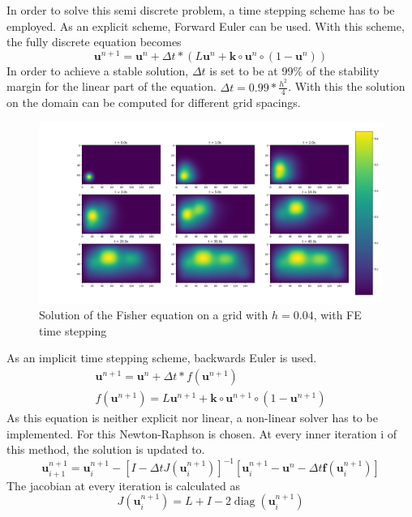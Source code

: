 \documentclass{article}
\begin{document}
In order to solve this semi discrete problem, a time stepping scheme has to be employed. As an explicit scheme, Forward Euler can be used. With this scheme, the fully discrete equation becomes
\begin{equation}
\mathbf{u}^{n+1} = \mathbf{u}^n+\Delta t*\left(L \mathbf{u}^n + \mathbf{k}\circ\mathbf{u}^n\circ\left(1-\mathbf{u}^n\right)\right)
\end{equation}
In order to achieve a stable solution, $\Delta t$ is set to be at 99\% of the stability margin for the linear part of the equation. $\Delta t = 0.99*\frac{h^2}{4}$. With this the solution on the domain can be computed for different grid spacings.
\begin{figure}[H]
	\centering
	\includegraphics[width=.9\linewidth]{4FE.png}
	\caption{Solution of the Fisher equation on a grid with $h=0.04$, with FE time stepping}
\end{figure}
As an implicit time stepping scheme, backwards Euler is used.
\begin{align}
\mathbf{u}^{n+1} = \mathbf{u}^n+\Delta t*f(\mathbf{u}^{n+1})\\
f(\mathbf{u}^{n+1})=L \mathbf{u}^{n+1} + \mathbf{k}\circ\mathbf{u}^{n+1}\circ\left(1-\mathbf{u}^{n+1}\right)
\end{align}
As this equation is neither explicit nor linear, a non-linear solver has to be implemented. For this Newton-Raphson is chosen. At every inner iteration i of this method, the solution is updated to.
\begin{equation}
\mathbf{u}_{i+1}^{n+1}=\mathbf{u}_{i}^{n+1}-\left[I-\Delta t J\left(\mathbf{u}_{i}^{n+1}\right)\right]^{-1}\left[\mathbf{u}_{i}^{n+1}-\mathbf{u}^{n}-\Delta t \mathbf{f}\left(\mathbf{u}_{i}^{n+1}\right)\right]
\end{equation}
The jacobian at every iteration is calculated as
\begin{equation}
J\left(\mathbf{u}_{i}^{n+1}\right)=L+I-2 \operatorname{diag}(\mathbf{u}_{i}^{n+1})
\end{equation}
\end{document}
